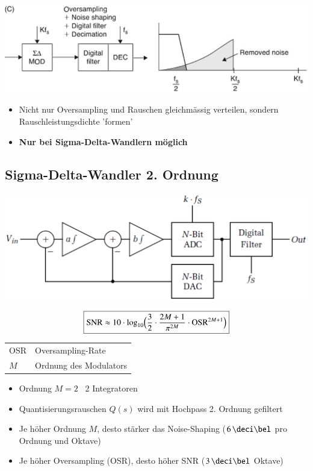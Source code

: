 \begin{minipage}[c]{0.48\columnwidth}
    \includegraphics[width=\columnwidth]{images/rauschen_mit_oversampling_und_noise_shaping.png}
\end{minipage}
\hfill
\begin{minipage}[c]{0.48\columnwidth}
    \begin{itemize}
        \item Nicht nur Oversampling und Rauschen gleichmässig verteilen, sondern Rauschleistungsdichte 'formen'
        \item \textbf{Nur bei Sigma-Delta-Wandlern möglich}
    \end{itemize}
\end{minipage}


\subsection{Sigma-Delta-Wandler 2. Ordnung}

\begin{minipage}[c]{0.48\columnwidth}
    \includegraphics[width=\columnwidth]{images/sigma-delta-wandler_ordnung_2.png}
\end{minipage}
\hfill
\begin{minipage}[c]{0.5\columnwidth}
    $$ \boxed{ \text{SNR} \approx 10 \cdot \log_{10} \Bigl( \frac{3}{2} \cdot \frac{2 M + 1}{\pi^{2M}} \cdot \text{OSR}^{2M+1} \Bigr) } $$
    \begin{tabular}{ll}
        OSR & Oversampling-Rate \\
        $M$ & Ordnung des Modulators
    \end{tabular}
\end{minipage}

\begin{itemize}
    \item Ordnung $M = 2$ \textrightarrow\ 2 Integratoren
    \item Quantisierungsrauschen $Q(s)$ wird mit Hochpass 2. Ordnung gefiltert
    \item Je höher Ordnung $M$, desto stärker das Noise-Shaping ($6 \, \deci \bel$ pro Ordnung und Oktave)
    \item Je höher Oversampling (OSR), desto höher SNR ($3 \, \deci \bel$ Oktave)
\end{itemize}

